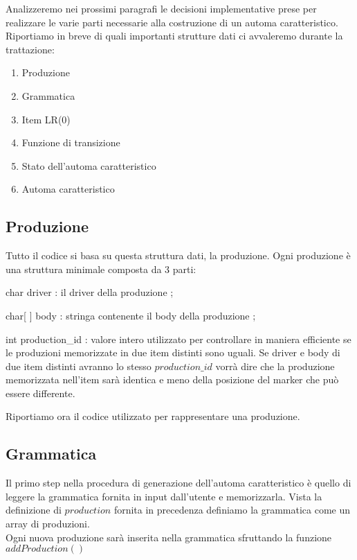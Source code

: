 \documentclass[12pt]{article}
\begin{document}
Analizzeremo nei prossimi paragrafi le decisioni implementative prese per realizzare le varie parti necessarie alla costruzione di un automa caratteristico. Riportiamo in breve di quali importanti strutture dati ci avvaleremo durante la trattazione:
\begin{enumerate}
\item Produzione
\item Grammatica
\item Item LR(0)
\item Funzione di transizione
\item Stato dell'automa caratteristico
\item Automa caratteristico
\end{enumerate}

\subsection{Produzione}
Tutto il codice si basa su questa struttura dati, la produzione. Ogni produzione è una struttura minimale composta da 3 parti:
\begin{list}{-}{}
\item char driver : il driver della produzione ;
\item char[ ] body : stringa contenente il body della produzione ;
\item int production\_id : valore intero utilizzato per controllare in maniera efficiente se le produzioni memorizzate in due item distinti sono uguali. Se driver e body di due item distinti avranno lo stesso $production\_id$ vorrà dire che la produzione memorizzata nell'item sarà identica e meno della posizione del marker che può essere differente.
\end{list}

Riportiamo ora il codice utilizzato per rappresentare una produzione.


\subsection{Grammatica}
Il primo step nella procedura di generazione dell'automa caratteristico è quello di leggere la grammatica fornita in input dall'utente e memorizzarla. Vista la definizione di $production$ fornita in precedenza definiamo la grammatica come un array di produzioni.\\

Ogni nuova produzione sarà inserita nella grammatica sfruttando la funzione $addProduction()$ \\
\end{document}
